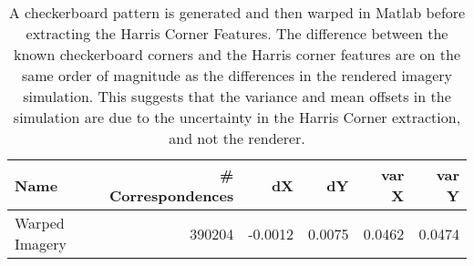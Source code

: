 \begin{table}[htbp]
  \centering
  \caption{A checkerboard pattern is generated and then warped in Matlab before extracting the Harris Corner Features.  The difference between the known checkerboard corners and the Harris corner features are on the same order of magnitude as the differences in the rendered imagery simulation.  This suggests that the variance and mean offsets in the simulation are due to the uncertainty in the Harris Corner extraction, and not the renderer.}
    \begin{tabular}{lrrrrr}
   	\toprule
    Name  & \# Correspondences & dX & dY & var X & var Y \\
    \midrule
    Warped Imagery & 390204 & -0.0012 & 0.0075 & 0.0462 & 0.0474 \\
    \bottomrule
    \end{tabular}%
  \label{tab:harrisdeltas}%
\end{table}%
